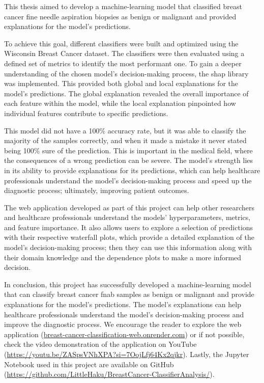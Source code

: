 This thesis aimed to develop a machine-learning model that classified breast cancer fine needle aspiration biopsies as benign or malignant and provided explanations for the model's predictions.

To achieve this goal, different classifiers were built and optimized using the Wisconsin Breast Cancer dataset. The classifiers were then evaluated using a defined set of metrics to identify the most performant one. To gain a deeper understanding of the chosen model's decision-making process, the \ac{shap} library was implemented. This provided both global and local explanations for the model's predictions. The global explanation revealed the overall importance of each feature within the model, while the local explanation pinpointed how individual features contribute to specific predictions.

This model did not have a 100\% accuracy rate, but it was able to classify the majority of the samples correctly, and when it made a mistake it never stated being 100\% sure of the prediction. This is important in the medical field, where the consequences of a wrong prediction can be severe. The model's strength lies in its ability to provide explanations for its predictions, which can help healthcare professionals understand the model's decision-making process and speed up the diagnostic process; ultimately, improving patient outcomes.

The web application developed as part of this project can help other researchers and healthcare professionals understand the models' hyperparameters, metrics, and feature importance. It also allows users to explore a selection of predictions with their respective waterfall plots, which provide a detailed explanation of the model's decision-making process; then they can use this information along with their domain knowledge and the dependence plots to make a more informed decision.

In conclusion, this project has successfully developed a machine-learning model that can classify breast cancer \acl{fnab} samples as benign or malignant and provide explanations for the model's predictions. The model's explanations can help healthcare professionals understand the model's decision-making process and improve the diagnostic process. We encourage the reader to explore the web application (\href{breast-cancer-classification-web.onrender.com}{breast-cancer-classification-web.onrender.com}) or if not possible, check the video demonstration of the application on YouTube (\href{https://youtu.be/ZASpsVNhXPA?si=7OojLfj64Kx2qjkr}{https://youtu.be/ZASpsVNhXPA?si=7OojLfj64Kx2qjkr}). Lastly, the Jupyter Notebook used in this project are available on GitHub \\(\href{https://github.com/LittleHaku/BreastCancer-ClassifierAnalysis/}{https://github.com/LittleHaku/BreastCancer-ClassifierAnalysis/}).